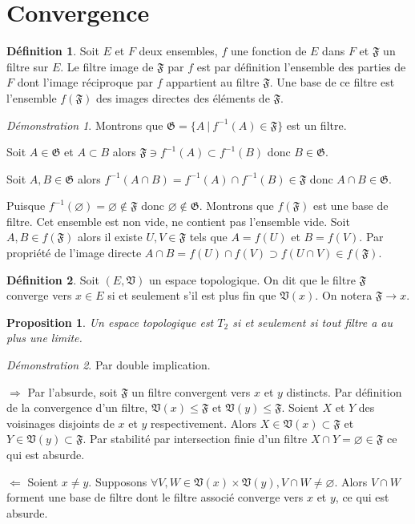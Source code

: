 \documentclass[a4paper, 11pt, french]{book}
\newenvironment{itemise}{\itemize}{\enditemize}
\theoremstyle{plain} %
\newtheorem{proposition}{Proposition}
\theoremstyle{definition} %
\newtheorem{definition}{Définition}
\theoremstyle{remark} %
\newtheorem*{demonstration}{Démonstration}
\newcommand{\1}{\mathds{1}}
\newcommand\vide{\varnothing}
\newcommand{\inv}[1]{#1^{-1}}
\renewcommand{\frak}[1]{\mathfrak{#1}}
\newcommand\ens[2]{\{#1 \ |\ #2\}}
\newcommand\equivalence[3]{
	\begin{demonstration}
		#1
		\begin{itemise}
			\item[$\Longrightarrow$] #2
			\item[$\Longleftarrow$] #3
		\end{itemise}
	\end{demonstration}
}
\begin{document}
\section{Convergence}

\begin{definition}
	Soit $E$ et $F$ deux ensembles, $f$ une fonction de $E$ dans $F$ et $\frak{F}$ un filtre sur $E$.
	Le filtre image de $\frak{F}$ par $f$ est par définition l'ensemble des parties de $F$ dont l'image réciproque par $f$ appartient au filtre $\frak{F}$.
	Une base de ce filtre est l'ensemble $f(\frak{F})$ des images directes des éléments de $\frak{F}$.
\end{definition}

\begin{demonstration}
	Montrons que $\frak{G}=\ens{A}{\inv{f}(A)\in\frak{F}}$ est un filtre.
	\begin{itemise}
		\item Soit $A\in\frak{G}$ et $A\subset B$ alors $\frak{F}\ni \inv{f}(A)\subset \inv{f}(B)$ donc $B\in\frak{G}$.
		\item Soit $A, B\in\frak{G}$ alors $\inv{f}(A\cap B)=\inv{f}(A)\cap \inv{f}(B)\in\frak{F}$ donc $A\cap B\in\frak{G}$.
		\item Puisque $\inv{f}(\vide)=\vide\notin\frak{F}$ donc $\vide\notin\frak{G}$.
	\end{itemise}
	Montrons que $f(\frak{F})$ est une base de filtre.
	Cet ensemble est non vide, ne contient pas l'ensemble vide.
	Soit $A, B\in f(\frak{F})$ alors il existe $U, V\in\frak{F}$ tels que $A=f(U)$ et $B=f(V)$.
	Par propriété de l'image directe $A\cap B=f(U)\cap f(V)\supset f(U\cap V)\in f(\frak{F})$.
\end{demonstration}

\begin{definition}
	Soit $(E, \frak{V})$ un espace topologique.
	On dit que le filtre $\frak{F}$ converge vers $x\in E$ si et seulement s'il est plus fin que $\frak{V}(x)$.
	On notera $\frak{F}\rightarrow x$.
\end{definition}

\begin{proposition}
	Un espace topologique est $T_2$ si et seulement si tout filtre a au plus une limite.
\end{proposition}

\equivalence{Par double implication.}{
	Par l'absurde, soit $\frak{F}$ un filtre convergent vers $x$ et $y$ distincts.
		Par définition de la convergence d'un filtre, $\frak{V}(x)\leqslant\frak{F}$ et $\frak{V}(y)\leqslant\frak{F}$.
		Soient $X$ et $Y$ des voisinages disjoints de $x$ et $y$ respectivement.
		Alors $X\in\frak{V}(x)\subset\frak{F}$ et $Y\in\frak{V}(y)\subset\frak{F}$.
		Par stabilité par intersection finie d'un filtre $X\cap Y=\vide\in\frak{F}$ ce qui est absurde.
}{
	Soient $x\neq y$.
		Supposons $\forall V, W\in\frak{V}(x)\times\frak{V}(y), V\cap W\neq\vide$.
		Alors $V\cap W$ forment une base de filtre dont le filtre associé converge vers $x$ et $y$, ce qui est absurde.
}
\end{document}
